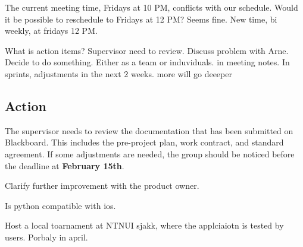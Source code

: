 The current meeting time, Fridays at 10 PM, conflicts with our schedule. Would it be possible to reschedule to Fridays at 12 PM? Seems fine. New time, bi weekly, at fridays 12 PM.  

What is action items? Supervisor need to review. Discuss problem with Arne. Decide to do something. Either as a team or induviduals. in meeting notes. In sprints, adjustments in the next 2 weeks. more will go deeeper

\subsection{Action}
The supervisor needs to review the documentation that has been submitted on Blackboard. This includes the pre-project plan, work contract, and standard agreement. If some adjustments are needed, the group should be noticed before the deadline at \textbf{February 15th}.

Clarify further improvement with the product owner. 

Is python compatible with ios. 

Host a local toarnament at NTNUI sjakk, where the applciaiotn is tested by users. Porbaly in april. 